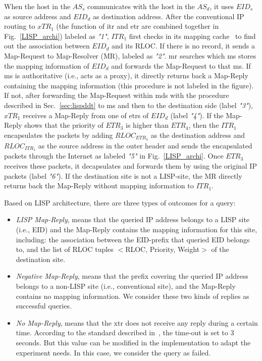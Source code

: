 When the host in the $AS_s$ communicates with the host in the $AS_d$, it uses $EID_s$ as source address and $EID_d$ as destination address. After the conventional IP routing to $xTR_1$ (the function of \acrshort{itr} and \acrshort{etr} are combined together in Fig.~\ref{LISP_archi}) labeled as \emph{"1"}, $ITR_1$ first checks in its mapping cache~\cite{lispCacheCost} to find out the association between $EID_d$ and its RLOC. If there is no record, it sends a Map-Request to Map-Resolver (MR), labeled as \emph{"2"}. \acrshort{mr} searches which \acrfull{ms} stores the mapping information of $EID_d$ and forwards the Map-Request to that \acrshort{ms}. If \acrshort{ms} is authoritative (i.e., acts as a proxy), it directly returns back a Map-Reply containing the mapping information (this procedure is not labeled in the figure). If not, after forwarding the Map-Request within \acrshort{mds} with the procedure described in Sec.~\ref{sec:lispddt} to \acrshort{ms} and then to the destination side (label \emph{"3"}), $xTR_1$ receives a Map-Reply from one of \acrshort{etr}s of $EID_d$ (label \emph{"4"}). If the Map-Reply shows that the priority of $ETR_3$ is higher than $ETR_4$, then the $ITR_1$ encapsulates the packets by adding $RLOC_{ETR_3}$ as the destination address and $RLOC_{ITR_1}$ as the source address in the outer header and sends the encapsulated packets through the Internet as labeled \emph{"5"} in Fig.~\ref{LISP_archi}. Once $ETR_3$ receives these packets, it decapsulates and forwards them by using the original IP packets (label \emph{"6"}). If the destination site is not a LISP-site, the MR directly returns back the Map-Reply without mapping information to $ITR_1$.

Based on LISP architecture, there are three types of outcomes for a query:
\begin{itemize}[noitemsep,topsep=0pt]
	\item \emph{LISP Map-Reply}, means that the queried IP address belongs to a LISP site (i.e., EID) and the Map-Reply contains the mapping information for this site, including: the association between the EID-prefix that queried EID belongs to, and the list of RLOC tuples $<$RLOC, Priority, Weight$>$ of the destination site.
	\item \emph{Negative Map-Reply}, means that the prefix covering the queried IP address belongs to a non-LISP site (i.e., conventional site), and the Map-Reply contains no mapping information. We consider these two kinds of replies as successful queries.
    \item \emph{No Map-Reply}, means that the \acrshort{xtr} does not receive any reply during a certain time. According to the standard described in~\cite{rfc6830}, the time-out is set to 3 seconds. But this value can be modified in the implementation to adapt the experiment needs. In this case, we consider the query as failed.
\end{itemize}


